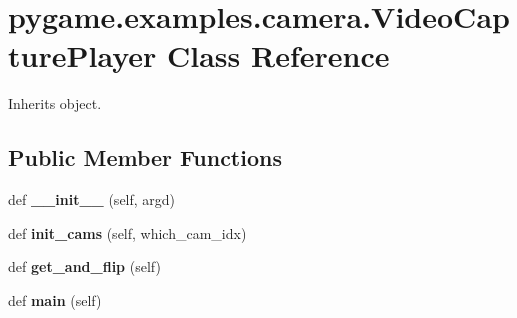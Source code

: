 \hypertarget{classpygame_1_1examples_1_1camera_1_1_video_capture_player}{}\section{pygame.\+examples.\+camera.\+Video\+Capture\+Player Class Reference}
\label{classpygame_1_1examples_1_1camera_1_1_video_capture_player}


Inherits object.

\subsection*{Public Member Functions}
\begin{DoxyCompactItemize}
\item 
\mbox{\label{classpygame_1_1examples_1_1camera_1_1_video_capture_player_ae0b66464502612e0ee080cec6dbb0c5f}} 
def {\bfseries \+\_\+\+\_\+init\+\_\+\+\_\+} (self, argd)
\item 
\mbox{\label{classpygame_1_1examples_1_1camera_1_1_video_capture_player_a03bf78bdd9201cf65ada9a150a17e598}} 
def {\bfseries init\+\_\+cams} (self, which\+\_\+cam\+\_\+idx)
\item 
\mbox{\label{classpygame_1_1examples_1_1camera_1_1_video_capture_player_ac615d3941e2b91d81fc02a75f4cde00c}} 
def {\bfseries get\+\_\+and\+\_\+flip} (self)
\item 
\mbox{\label{classpygame_1_1examples_1_1camera_1_1_video_capture_player_a392938744befc08542d53baa11a45b5f}} 
def {\bfseries main} (self)
\end{DoxyCompactItemize}

